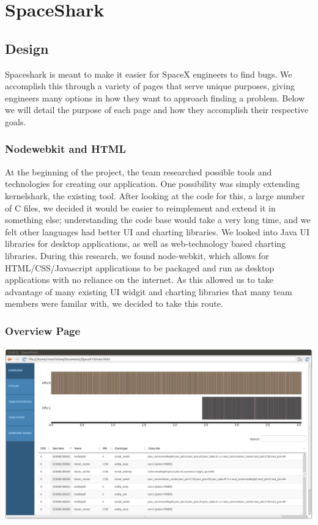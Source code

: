 \documentclass{hmcclinic}
\begin{document}
\chapter{SpaceShark}
\section{Design} %

  Spaceshark is meant to make it easier for SpaceX engineers to find bugs. We
  accomplish this through a variety of pages that serve unique purposes, giving
  engineers many options in how they want to approach finding a problem. Below
  we will detail the purpose of each page and how they accomplish their
  respective goals.

  \subsection{Nodewebkit and HTML} %
    At the beginning of the project, the team researched possible tools and
    technologies for creating our application. One possibility was simply
    extending kernelshark, the existing tool. After looking at the code for
    this, a large number of C files, we decided it would be easier to
    reimplement and extend it in something else; understanding the code base
    would take a very long time, and we felt other languages had better
    UI and charting libraries. We looked into Java UI libraries for
    desktop applications, as well as web-technology based charting libraries.
    During this research, we found node-webkit, which allows for
    HTML/CSS/Javascript applications to be packaged and run as desktop
    applications with no reliance on the internet. As this allowed us to take
    advantage of many existing UI widgit and charting libraries that many team
    members were familar with, we decided to take this route.
  \subsection{Overview Page} 
  
  \includegraphics[scale=0.25]{overview-page.png}
  
\end{document}
